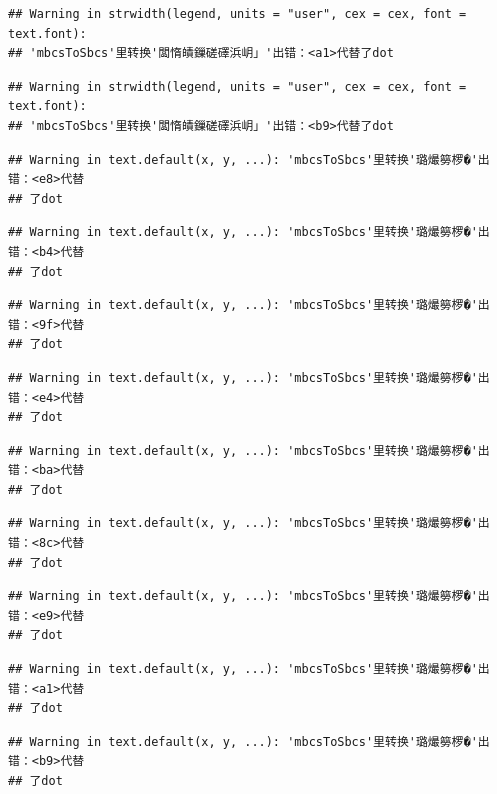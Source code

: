\documentclass[
]{book}
\begin{document}
\begin{verbatim}
## Warning in strwidth(legend, units = "user", cex = cex, font = text.font):
## 'mbcsToSbcs'里转换'闆惰皟鏁磋礋浜岄」'出错：<a1>代替了dot
\end{verbatim}

\begin{verbatim}
## Warning in strwidth(legend, units = "user", cex = cex, font = text.font):
## 'mbcsToSbcs'里转换'闆惰皟鏁磋礋浜岄」'出错：<b9>代替了dot
\end{verbatim}

\begin{verbatim}
## Warning in text.default(x, y, ...): 'mbcsToSbcs'里转换'璐熶簩椤�'出错：<e8>代替
## 了dot
\end{verbatim}

\begin{verbatim}
## Warning in text.default(x, y, ...): 'mbcsToSbcs'里转换'璐熶簩椤�'出错：<b4>代替
## 了dot
\end{verbatim}

\begin{verbatim}
## Warning in text.default(x, y, ...): 'mbcsToSbcs'里转换'璐熶簩椤�'出错：<9f>代替
## 了dot
\end{verbatim}

\begin{verbatim}
## Warning in text.default(x, y, ...): 'mbcsToSbcs'里转换'璐熶簩椤�'出错：<e4>代替
## 了dot
\end{verbatim}

\begin{verbatim}
## Warning in text.default(x, y, ...): 'mbcsToSbcs'里转换'璐熶簩椤�'出错：<ba>代替
## 了dot
\end{verbatim}

\begin{verbatim}
## Warning in text.default(x, y, ...): 'mbcsToSbcs'里转换'璐熶簩椤�'出错：<8c>代替
## 了dot
\end{verbatim}

\begin{verbatim}
## Warning in text.default(x, y, ...): 'mbcsToSbcs'里转换'璐熶簩椤�'出错：<e9>代替
## 了dot
\end{verbatim}

\begin{verbatim}
## Warning in text.default(x, y, ...): 'mbcsToSbcs'里转换'璐熶簩椤�'出错：<a1>代替
## 了dot
\end{verbatim}

\begin{verbatim}
## Warning in text.default(x, y, ...): 'mbcsToSbcs'里转换'璐熶簩椤�'出错：<b9>代替
## 了dot
\end{verbatim}
\end{document}

